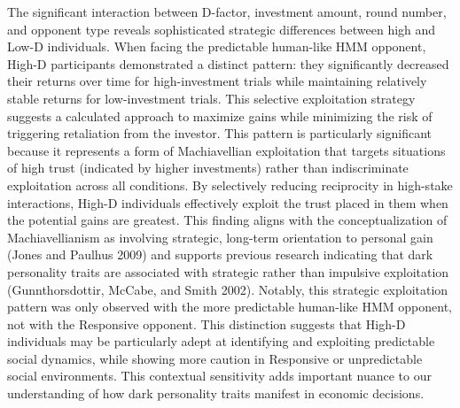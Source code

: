 \documentclass[
]{article}
\begin{document}
The significant interaction between D-factor, investment amount, round number, and opponent type reveals sophisticated strategic differences between high and Low-D individuals. When facing the predictable human-like HMM opponent, High-D participants demonstrated a distinct pattern: they significantly decreased their returns over time for high-investment trials while maintaining relatively stable returns for low-investment trials. This selective exploitation strategy suggests a calculated approach to maximize gains while minimizing the risk of triggering retaliation from the investor.
This pattern is particularly significant because it represents a form of Machiavellian exploitation that targets situations of high trust (indicated by higher investments) rather than indiscriminate exploitation across all conditions. By selectively reducing reciprocity in high-stake interactions, High-D individuals effectively exploit the trust placed in them when the potential gains are greatest. This finding aligns with the conceptualization of Machiavellianism as involving strategic, long-term orientation to personal gain (Jones and Paulhus 2009) and supports previous research indicating that dark personality traits are associated with strategic rather than impulsive exploitation (Gunnthorsdottir, McCabe, and Smith 2002).
Notably, this strategic exploitation pattern was only observed with the more predictable human-like HMM opponent, not with the Responsive opponent. This distinction suggests that High-D individuals may be particularly adept at identifying and exploiting predictable social dynamics, while showing more caution in Responsive or unpredictable social environments. This contextual sensitivity adds important nuance to our understanding of how dark personality traits manifest in economic decisions.
\end{document}
